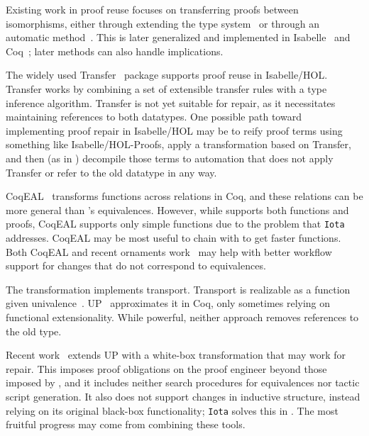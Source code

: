 
Existing work in proof reuse focuses on transferring proofs between isomorphisms,
either through extending the type system~\cite{Barthe:2001:TIP:646793.704711} or through an automatic method~\cite{Magaud2002}.
This is later generalized and implemented in Isabelle~\cite{Huffman2013} and Coq~\cite{ZimmermannH15, tabareau:hal-01559073};
later methods can also handle implications.


The widely used Transfer~\cite{Huffman2013} package supports proof reuse in Isabelle/HOL. %
Transfer works by combining a set of extensible transfer rules with a type inference algorithm.
Transfer is not yet suitable for repair, as it necessitates maintaining references to both datatypes.
One possible path toward implementing proof repair in Isabelle/HOL may be to reify proof terms using something like
Isabelle/HOL-Proofs, apply a transformation based on Transfer, and then (as in \toolname) decompile those terms to automation that does not apply Transfer or refer to the old datatype in any way.

CoqEAL~\cite{cohen:hal-01113453} transforms functions across relations in Coq,
and these relations can be more general than \toolnamec's equivalences.
However, while \toolnamec supports both functions and proofs, CoqEAL supports only simple functions
due to the problem that \lstinline{Iota} addresses.
CoqEAL may be most useful to chain with \toolnamec to get faster functions.
Both CoqEAL and recent ornaments work~\cite{williamsphd} may help with
better workflow support for changes that do not correspond to equivalences.

The \toolnamec transformation implements transport.
Transport is realizable as a function given univalence~\cite{univalent2013homotopy}.
UP~\cite{tabareau2017equivalences} approximates it
in Coq, only sometimes relying on functional extensionality.
While powerful, neither approach removes references to the old type. %

Recent work~\cite{tabareau2019marriage} extends UP with 
a white-box transformation that may work for repair.
This imposes proof obligations on the proof engineer beyond those imposed by \toolname,
and it includes neither search procedures for equivalences nor tactic script generation.
It also does not support changes in inductive structure,
instead relying on its original black-box functionality;
\lstinline{Iota} solves this in \toolname. %
The most fruitful progress may come from combining these tools. %

